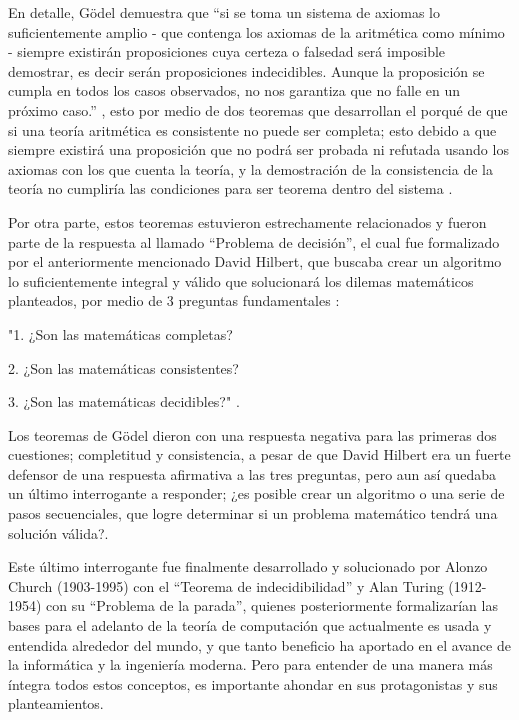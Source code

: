 \documentclass[11pt]{article}
\begin{document}
{En detalle, Gödel demuestra que “si se toma un sistema de axiomas lo suficientemente amplio - que contenga los axiomas de la aritmética como mínimo - siempre existirán proposiciones cuya certeza o falsedad será imposible demostrar, es decir serán proposiciones indecidibles. Aunque la proposición se cumpla en todos los casos observados, no nos garantiza que no falle en un próximo caso.” \citep{ScieloCrespo}, esto por medio de dos teoremas que desarrollan el porqué de que si una teoría aritmética es consistente no puede ser completa; esto debido a que siempre existirá una proposición que no podrá ser probada ni refutada usando los axiomas con los que cuenta la teoría, y la demostración de la consistencia de la teoría no cumpliría las condiciones para ser teorema dentro del sistema \citep{IncomGodelWiki}.
\newline

Por otra parte, estos teoremas estuvieron estrechamente relacionados y fueron parte de la respuesta al llamado “Problema de decisión”, el cual fue formalizado por el anteriormente mencionado David Hilbert, que buscaba crear un algoritmo lo suficientemente integral y válido que solucionará los dilemas matemáticos planteados, por medio de 3 preguntas fundamentales \citep{TuringWiki}: 
\newline

"1.	¿Son las matemáticas completas?

 2.	¿Son las matemáticas consistentes?

 3.	¿Son las matemáticas decidibles?" \citep{TuringWiki}.
\newline

Los teoremas de Gödel dieron con una respuesta negativa para las primeras dos cuestiones; completitud y consistencia, a pesar de que David Hilbert era un fuerte defensor de una respuesta afirmativa a las tres preguntas, pero aun así quedaba un último interrogante a responder; ¿es posible crear un algoritmo o una serie de pasos secuenciales, que logre determinar si un problema matemático tendrá una solución válida?.
\newline

Este último interrogante fue finalmente desarrollado y solucionado por Alonzo Church (1903-1995) con el “Teorema de indecidibilidad” y Alan Turing (1912-1954) con su “Problema de la parada”, quienes posteriormente formalizarían las bases para el adelanto de la teoría de computación que actualmente es usada y entendida alrededor del mundo, y que tanto beneficio ha aportado en el avance de la informática y la ingeniería moderna. Pero para entender de una manera más íntegra todos estos conceptos, es importante ahondar en sus protagonistas y sus planteamientos.
\newline

}
\end{document}
